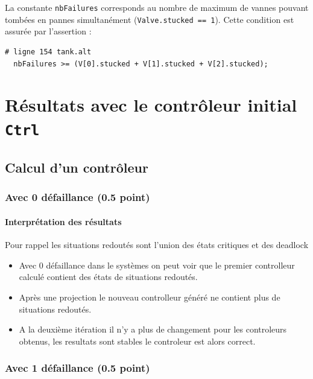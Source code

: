 \documentclass[a4paper]{book}
\begin{document}
La constante \texttt{nbFailures} corresponds au nombre de maximum de vannes pouvant tombées
en pannes simultanément (\texttt{Valve.stucked == 1}).
Cette condition est assurée par l'assertion :
\begin{verbatim}
# ligne 154 tank.alt
  nbFailures >= (V[0].stucked + V[1].stucked + V[2].stucked);
\end{verbatim}

\section{Résultats avec le contrôleur initial {\tt Ctrl}}
\subsection{Calcul d'un contrôleur}
\subsubsection{Avec 0 défaillance (0.5 point)}

\paragraph{Interprétation des résultats}
Pour rappel les situations redoutés sont l'union des états critiques et des deadlock 
\begin{itemize}
    \item Avec 0 défaillance dans le systèmes on peut voir que le premier controlleur calculé
contient des états de situations redoutés.
    \item Après une projection le nouveau controlleur généré ne contient plus de situations redoutés.
    \item A la deuxième itération il n'y a plus de changement pour les controleurs obtenus,
les resultats sont stables le controleur est alors correct.
\end{itemize}

\subsubsection{Avec 1 défaillance (0.5 point)}

\end{document}
